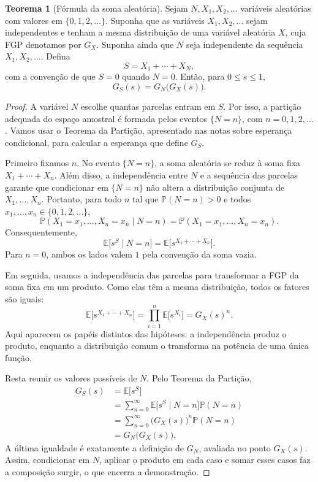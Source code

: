 \documentclass[12pt,portuguese]{article}
\theoremstyle{definition}
\newtheorem{theorem}{Teorema}
\theoremstyle{plainexercise}
\theoremstyle{starredexercise}
\theoremstyle{definition}
\begin{document}
\begin{theorem}[Fórmula da soma aleatória]\label{thm:formula-soma-aleatoria}
Sejam $N,X_1,X_2,\ldots$ variáveis aleatórias com valores em
$\{0,1,2,\ldots\}$. Suponha que as variáveis $X_1,X_2,\ldots$ sejam
independentes e tenham a mesma distribuição de uma variável aleatória $X$,
cuja FGP denotamos por $G_X$.
Suponha ainda que $N$ seja independente da sequência
$X_1,X_2,\ldots$. Defina
\[
S=X_1+\cdots+X_N,
\]
com a convenção de que $S=0$ quando $N=0$. Então, para $0\leqslant s\leqslant1$,
\begin{equation}\label{eq:soma-aleatoria}
G_S(s)=G_N\bigl(G_X(s)\bigr).
\end{equation}
\end{theorem}

\begin{proof}
A variável $N$ escolhe quantas parcelas entram em $S$. Por isso, a partição
adequada do espaço amostral é formada pelos eventos $\{N=n\}$, com
$n=0,1,2,\ldots$. Vamos usar o Teorema da Partição, apresentado nas notas
sobre esperança condicional, para calcular a esperança que define $G_S$.

Primeiro fixamos $n$. No evento $\{N=n\}$, a soma aleatória se reduz à soma
fixa $X_1+\cdots+X_n$. Além disso, a independência entre $N$ e a sequência
das parcelas garante que condicionar em $\{N=n\}$ não altera a distribuição
conjunta de $X_1,\ldots,X_n$. Portanto, para todo $n$ tal que
$\mathbb{P}(N=n)>0$ e todos $x_1,\ldots,x_n\in\{0,1,2,\ldots\}$,
\[
\mathbb{P}(X_1=x_1,\ldots,X_n=x_n\mid N=n)
=\mathbb{P}(X_1=x_1,\ldots,X_n=x_n).
\]
Consequentemente,
\[
\mathbb{E}\bigl[s^S\mid N=n\bigr]
=\mathbb{E}\bigl[s^{X_1+\cdots+X_n}\bigr].
\]
Para $n=0$, ambos os lados valem $1$ pela convenção da soma vazia.

Em seguida, usamos a independência das parcelas para transformar a FGP da
soma fixa em um produto. Como elas têm a mesma distribuição, todos os fatores
são iguais:
\[
\mathbb{E}\bigl[s^{X_1+\cdots+X_n}\bigr]
=\prod_{i=1}^{n}\mathbb{E}\bigl[s^{X_i}\bigr]
=G_X(s)^n.
\]
Aqui aparecem os papéis distintos das hipóteses: a independência produz o
produto, enquanto a distribuição comum o transforma na potência de uma única
função.

Resta reunir os valores possíveis de $N$. Pelo Teorema da Partição,
\begin{align*}
G_S(s)
&=\mathbb{E}\bigl[s^S\bigr]
\\[0.2cm]
&=\sum_{n=0}^{\infty}
\mathbb{E}\bigl[s^S\mid N=n\bigr]\mathbb{P}(N=n)
\\[0.2cm]
&=\sum_{n=0}^{\infty} \bigl(G_X(s)\bigr)^n\mathbb{P}(N=n)
\\[0.2cm]
&=G_N\bigl(G_X(s)\bigr).
\end{align*}
A última igualdade é exatamente a definição de $G_N$, avaliada no ponto
$G_X(s)$. Assim, condicionar em $N$, aplicar o produto em cada caso e somar
esses casos faz a composição surgir, o que encerra a demonstração.
\end{proof}
\end{document}
